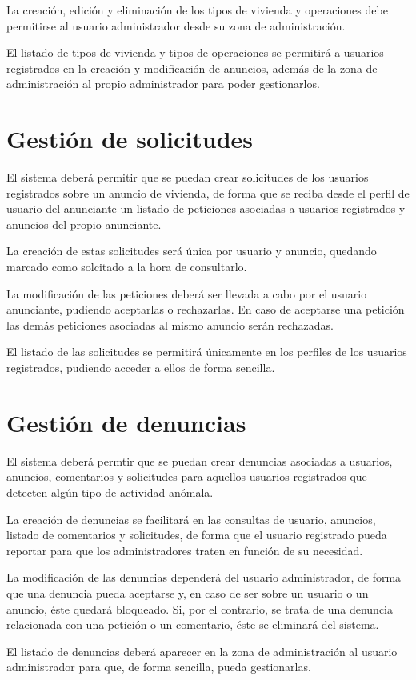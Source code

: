 La creaci\'{o}n, edici\'{o}n y eliminaci\'{o}n de los tipos de vivienda y operaciones debe permitirse al usuario administrador desde su zona de administraci\'{o}n.

El listado de tipos de vivienda y tipos de operaciones se permitir\'{a} a usuarios registrados en la creaci\'{o}n y modificaci\'{o}n de anuncios, adem\'{a}s de la zona de administraci\'{o}n al propio administrador para poder gestionarlos.


\section{Gesti\'{o}n de solicitudes}

El sistema deber\'{a} permitir que se puedan crear solicitudes de los usuarios registrados sobre un anuncio de vivienda, de forma que se reciba desde el perfil de usuario del anunciante un listado de peticiones asociadas a usuarios registrados y anuncios del propio anunciante.

La creaci\'{o}n de estas solicitudes ser\'{a} \'{u}nica por usuario y anuncio, quedando marcado como solcitado a la hora de consultarlo.

La modificaci\'{o}n de las peticiones deber\'{a} ser llevada a cabo por el usuario anunciante, pudiendo aceptarlas o rechazarlas. En caso de aceptarse una petici\'{o}n las dem\'{a}s peticiones asociadas al mismo anuncio ser\'{a}n rechazadas.

El listado de las solicitudes se permitir\'{a} \'{u}nicamente en los perfiles de los usuarios registrados, pudiendo acceder a ellos de forma sencilla.


\section{Gesti\'{o}n de denuncias}

El sistema deber\'{a} permtir que se puedan crear denuncias asociadas a usuarios, anuncios, comentarios y solicitudes para aquellos usuarios registrados que detecten alg\'{u}n tipo de actividad an\'{o}mala.

La creaci\'{o}n de denuncias se facilitar\'{a} en las consultas de usuario, anuncios, listado de comentarios y solicitudes, de forma que el usuario registrado pueda reportar para que los administradores traten en funci\'{o}n de su necesidad.

La modificaci\'{o}n de las denuncias depender\'{a} del usuario administrador, de forma que una denuncia pueda aceptarse y, en caso de ser sobre un usuario o un anuncio, \'{e}ste quedar\'{a} bloqueado. Si, por el contrario, se trata de una denuncia relacionada con una petici\'{o}n o un comentario, \'{e}ste se eliminar\'{a} del sistema.

El listado de denuncias deber\'{a} aparecer en la zona de administraci\'{o}n al usuario administrador para que, de forma sencilla, pueda gestionarlas.